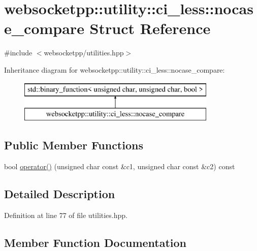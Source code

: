 \hypertarget{structwebsocketpp_1_1utility_1_1ci__less_1_1nocase__compare}{}\section{websocketpp\+:\+:utility\+:\+:ci\+\_\+less\+:\+:nocase\+\_\+compare Struct Reference}
\label{structwebsocketpp_1_1utility_1_1ci__less_1_1nocase__compare}


{\ttfamily \#include $<$websocketpp/utilities.\+hpp$>$}

Inheritance diagram for websocketpp\+:\+:utility\+:\+:ci\+\_\+less\+:\+:nocase\+\_\+compare\+:\begin{figure}[H]
\begin{center}
\leavevmode
\includegraphics[height=2.000000cm]{structwebsocketpp_1_1utility_1_1ci__less_1_1nocase__compare}
\end{center}
\end{figure}
\subsection*{Public Member Functions}
\begin{DoxyCompactItemize}
\item 
bool \hyperlink{structwebsocketpp_1_1utility_1_1ci__less_1_1nocase__compare_ac2cf344b42aee7f8247662175e72a271}{operator()} (unsigned char const \&c1, unsigned char const \&c2) const 
\end{DoxyCompactItemize}


\subsection{Detailed Description}


Definition at line 77 of file utilities.\+hpp.



\subsection{Member Function Documentation}
\hypertarget{structwebsocketpp_1_1utility_1_1ci__less_1_1nocase__compare_ac2cf344b42aee7f8247662175e72a271}{}
